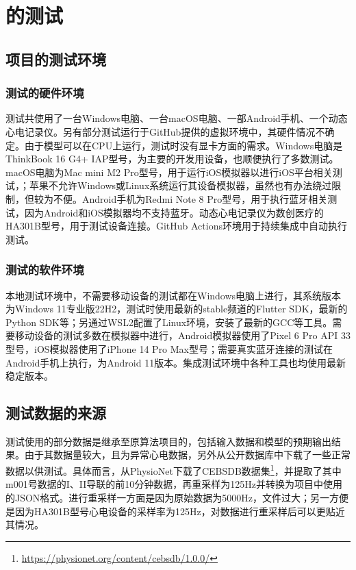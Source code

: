 \chapter{\app 的测试}\label{ch:test}


\section{项目的测试环境}\label{sec:test-env}

\subsection{测试的硬件环境}\label{subsec:test-hardware}

测试共使用了一台Windows电脑、一台macOS电脑、一部Android手机、一个动态心电记录仪。另有部分测试运行于GitHub提供的虚拟环境中，其硬件情况不确定。由于模型可以在CPU上运行，测试时没有显卡方面的需求。Windows电脑是ThinkBook 16 G4+ IAP型号，为主要的开发用设备，也顺便执行了多数测试。macOS电脑为Mac mini M2 Pro型号，用于运行iOS模拟器以进行iOS平台相关测试，；苹果不允许Windows或Linux系统运行其设备模拟器，虽然也有办法绕过限制，但较为不便。Android手机为Redmi Note 8 Pro型号，用于执行蓝牙相关测试，因为Android和iOS模拟器均不支持蓝牙。动态心电记录仪为数创医疗的HA301B型号，用于测试设备连接。GitHub Actions环境用于持续集成中自动执行测试。

\subsection{测试的软件环境}\label{subsec:test-software}

本地测试环境中，不需要移动设备的测试都在Windows电脑上进行，其系统版本为Windows 11专业版22H2，测试时使用最新的stable频道的Flutter SDK，最新的Python SDK等；另通过WSL2配置了Linux环境，安装了最新的GCC等工具。需要移动设备的测试多数在模拟器中进行，Android模拟器使用了Pixel 6 Pro API 33型号，iOS模拟器使用了iPhone 14 Pro Max型号；需要真实蓝牙连接的测试在Android手机上执行，为Android 11版本。集成测试环境中各种工具也均使用最新稳定版本。


\section{测试数据的来源}\label{sec:test-data}

测试使用的部分数据是继承至原算法项目的，包括输入数据和模型的预期输出结果。由于其数据量较大，且为异常心电数据，另外从公开数据库中下载了一些正常数据以供测试。具体而言，从PhysioNet下载了CEBSDB数据集\footnote{\url{https://physionet.org/content/cebsdb/1.0.0/}}，并提取了其中m001号数据的I、II导联的前10分钟数据，再重采样为125Hz并转换为项目中使用的JSON格式。进行重采样一方面是因为原始数据为5000Hz，文件过大；另一方便是因为HA301B型号心电设备的采样率为125Hz，对数据进行重采样后可以更贴近其情况。


